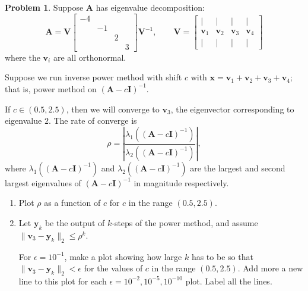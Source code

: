 \documentclass[12pt]{article}
\theoremstyle{definition}
\newtheorem{problem}{Problem}
\renewcommand{\vec}{\mathbf}
\begin{document}
\clearpage
\begin{problem}
Suppose $\vec{A}$ has eigenvalue decomposition:
\[
    \vec{A} 
    = 
    \vec{V}
    \begin{bmatrix}
        -4 \\ & -1 \\ && 2 \\ &&& 3
    \end{bmatrix}
    \vec{V}^{-1}
    ,\qquad
    \vec{V} = \begin{bmatrix} |&|&|&| \\ \vec{v}_1 & \vec{v}_2 & \vec{v}_3 & \vec{v}_4 \\ |&|&|&| \end{bmatrix}
    \]
where the $\vec{v}_i$ are all orthonormal.

    Suppose we run inverse power method with shift $c$ with $\vec{x} = \vec{v}_1 + \vec{v}_2 + \vec{v}_3 + \vec{v}_4$; that is, power method on $(\vec{A} - c\vec{I})^{-1}$.

    If $c\in(0.5,2.5)$, then we will converge to $\vec{v}_3$, the eigenvector corresponding to eigenvalue $2$.
    The rate of converge is
    \[
        \rho = \left| \frac{\lambda_1((\vec{A}-c\vec{I})^{-1})}{\lambda_2((\vec{A}-c\vec{I})^{-1})} \right|,
    \]
    where $\lambda_1((\vec{A}-c\vec{I})^{-1})$ and $\lambda_2((\vec{A}-c\vec{I})^{-1})$ are the largest and second largest eigenvalues of $(\vec{A} - c\vec{I})^{-1}$ in magnitude respectively.


    \begin{enumerate}
        \item Plot $\rho$ as a function of $c$ for $c$ in the range $(0.5, 2.5)$.

        \item Let $\vec{y}_k$ be the output of $k$-steps of the power method, and assume $\|\vec{v}_3 - \vec{y}_k\|_2 \leq \rho^k$.
            
            For $\epsilon = 10^{-1}$, make a plot showing how large $k$ has to be so that $\|\vec{v}_3 - \vec{y}_k\|_2 < \epsilon$ for the values of $c$ in the range $(0.5,2.5)$.
            Add more a new line to this plot for each $\epsilon = 10^{-2}, 10^{-5}, 10^{-10}$ plot. Label all the lines.

            

    \end{enumerate}




\end{problem}
\end{document}
